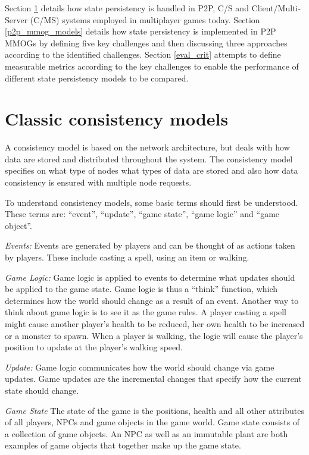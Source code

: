 \documentclass[10pt,a4paper,journal,cspaper,compsoc]{IEEEtran}
\begin{document}
Section \ref{classic_models} details how state persistency is handled in P2P, C/S and Client/Multi-Server (C/MS) systems employed in multiplayer
games today.
%
Section \ref{p2p_mmog_models} details how state persistency is implemented in P2P MMOGs by defining five key challenges and then discussing three
approaches according to the identified challenges.
%
Section \ref{eval_crit} attempts to define measurable metrics according to the key challenges to enable the performance of different state
persistency models to be compared.


\section{Classic consistency models}
\label{classic_models}

A consistency model is based on the network architecture, but deals with how data are stored and distributed throughout the system. The consistency
model specifies on what type of nodes what types of data are stored and also how data consistency is ensured with multiple node requests.

To understand consistency models, some basic terms should first be understood. These terms are: ``event'', ``update'', ``game state'', ``game logic''
and ``game object''.

\emph{Events:} Events are generated by players and can be thought of as actions taken by players. These include casting a spell, using an item
    or walking.

\emph{Game Logic:} Game logic is applied to events to determine what updates should be applied to the game state. Game logic is thus a
    ``think'' function, which determines how the world should change as a result of an event. Another way to think about game logic is to see
    it as the game rules. A player casting a spell might cause another player's health to be reduced, her own health to be increased or a
    monster to spawn. When a player is walking, the logic will cause the player's position to update at the player's walking speed.

\emph{Update:} Game logic communicates how the world should change via game updates. Game updates are the incremental changes that specify how
    the current state should change.

\emph{Game State} The state of the game is the positions, health and all other attributes of all players, NPCs and game objects in the game
    world. Game state consists of a collection of game objects. An NPC as well as an immutable plant are both examples of game objects that
    together make up the game state.
\end{document}
